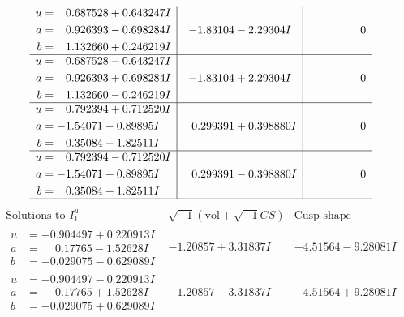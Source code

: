 \documentclass[1p]{elsarticle_modified}
\theoremstyle{definition}
\newcommand{\I}{\sqrt{-1}}
\begin{document}
$$\begin{array}{c|c|c}
\begin{aligned}
u &= \phantom{-}0.687528 + 0.643247 I \\
a &= \phantom{-}0.926393 - 0.698284 I \\
b &= \phantom{-}1.132660 + 0.246219 I\end{aligned}
 & -1.83104 - 2.29304 I & \phantom{-0.000000 } 0 \\ \hline\begin{aligned}
u &= \phantom{-}0.687528 - 0.643247 I \\
a &= \phantom{-}0.926393 + 0.698284 I \\
b &= \phantom{-}1.132660 - 0.246219 I\end{aligned}
 & -1.83104 + 2.29304 I & \phantom{-0.000000 } 0 \\ \hline\begin{aligned}
u &= \phantom{-}0.792394 + 0.712520 I \\
a &= -1.54071 - 0.89895 I \\
b &= \phantom{-}0.35084 - 1.82511 I\end{aligned}
 & \phantom{-}0.299391 + 0.398880 I & \phantom{-0.000000 } 0 \\ \hline\begin{aligned}
u &= \phantom{-}0.792394 - 0.712520 I \\
a &= -1.54071 + 0.89895 I \\
b &= \phantom{-}0.35084 + 1.82511 I\end{aligned}
 & \phantom{-}0.299391 - 0.398880 I & \phantom{-0.000000 } 0\\
 \hline 
 \end{array}$$\newpage$$\begin{array}{c|c|c}  
\text{Solutions to }I^u_{1}& \I (\text{vol} + \sqrt{-1}CS) & \text{Cusp shape}\\
 \hline 
\begin{aligned}
u &= -0.904497 + 0.220913 I \\
a &= \phantom{-}0.17765 - 1.52628 I \\
b &= -0.029075 - 0.629089 I\end{aligned}
 & -1.20857 + 3.31837 I & -4.51564 - 9.28081 I \\ \hline\begin{aligned}
u &= -0.904497 - 0.220913 I \\
a &= \phantom{-}0.17765 + 1.52628 I \\
b &= -0.029075 + 0.629089 I\end{aligned}
 & -1.20857 - 3.31837 I & -4.51564 + 9.28081 I \\ \hline\begin{aligned}

\end{aligned}
\end{array}$$
\end{document}
